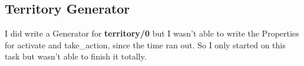 \documentclass[11pt,a4paper]{article}
\begin{document}
\subsection{Territory Generator}
I did write a Generator for \textbf{territory/0} but I wasn't able to write the Properties for activate and take\_action, since the time ran out.
So I only started on this task but wasn't able to finish it totally.




\end{document}

